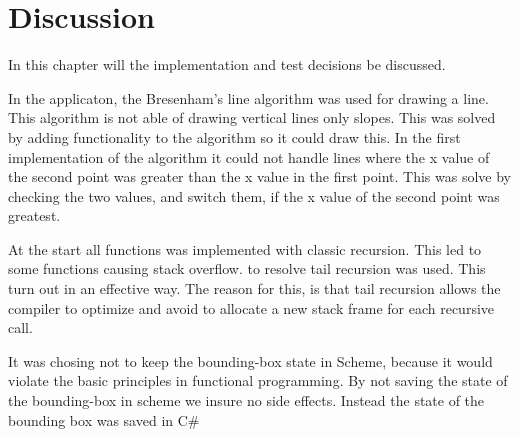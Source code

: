 \chapter{Discussion}
\label{chp:disc}

In this chapter will the implementation and test decisions be discussed. 

In the applicaton, the Bresenham’s line algorithm was used for drawing a line. This algorithm is not able of drawing vertical lines only slopes. This was solved by adding functionality to the algorithm so it could draw this. In the first implementation of the algorithm it could not handle lines where the x value of the second point was greater than the x value in the first point. This was solve by checking the two values, and switch them, if the x value of the second point was greatest.


At the start all functions was implemented with classic recursion. This led to some functions causing stack overflow. to resolve tail recursion was used. This turn out in an effective way. The reason for this, is that tail recursion allows the compiler to optimize and avoid to allocate a new stack frame for each recursive call. 

It was chosing not to keep the bounding-box state in Scheme, because it would violate the basic principles in functional programming. By not saving the state of the bounding-box in scheme we insure no side effects. Instead the state of the bounding box was saved in C\# 